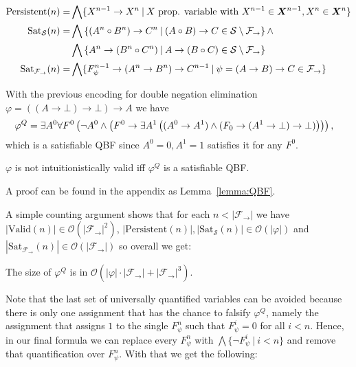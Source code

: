 \documentclass[runningheads]{llncs}
\begin{document}
\begin{definition}
\begin{align*}
		\text{\normalfont Persistent}(n) = & \bigwedge\{X^{n-1}\to X^n\:|\: X \text{ prop. variable with }X^{n-1}\in\vec X^{n-1}, X^n \in\vec X^{n}\}\\
		\text{\normalfont Sat}_{\mathcal S}(n) = &\bigwedge\left\{(A^n\circ B^n)\to C^n\:|\:(A\circ B)\to C\in \mathcal S\setminus\mathcal F_\to\right\}\wedge\\
		&\bigwedge\left\{A^n\to (B^n\circ C^n)\:|\:A\to (B\circ C)\in \mathcal S\setminus\mathcal F_\to\right\}\\
		\text{\normalfont Sat}_{\mathcal F_\to}(n) = & \bigwedge\{F^{n-1}_\psi\to (A^n\to B^n)\to C^{n-1}\:|\:\psi = (A\to B)\to C\in\mathcal F_\to\}
	\end{align*}
\end{definition}

\begin{example}
	With the previous encoding for double negation elimination $\varphi = ((A\to \bot)\to \bot)\to A$ we have
	$$\hspace*{-.3cm}
	\varphi^Q = \exists A^0\forall F^0\left(\neg A^0\wedge\left(F^0\to \exists A^1\left((A^0\to A^1)\wedge(F_0\to (A^1\to \bot)\to \bot)\right)\right)\right),
	$$
	which is a satisfiable QBF since $A^0 = 0, A^1 = 1$ satisfies it for any $F^0$.
\end{example}


\begin{lemma}
	$\varphi$ is not intuitionistically valid iff $\varphi^Q$ is a satisfiable QBF.
\end{lemma}
A proof can be found in the appendix as Lemma~\ref{lemma:QBF}.

A simple counting argument shows that for each $n < |\mathcal F_\to|$ we have $|\text{Valid}(n)|\in \mathcal O(|\mathcal F_\to|^2)$, $|\text{Persistent}(n)|, |\text{Sat}_{\mathcal S}(n)|\in \mathcal O(|\varphi|)$ and $|\text{Sat}_{\mathcal F_\to}(n)|\in \mathcal O(|\mathcal F_\to|)$ so overall we get:
\begin{lemma}
	The size of $\varphi^Q$ is in $\mathcal O(|\varphi|\cdot|\mathcal F_\to| + |\mathcal F_\to|^3)$.
\end{lemma}

Note that the last set of universally quantified variables can be avoided because there is only one assignment that has the chance to falsify $\varphi^Q$, namely the assignment that assigns $1$ to the single $F_\psi^n$ such that $F_\psi^i = 0$ for all $i < n$. Hence, in our final formula we can replace every $F_\psi^n$ with $\bigwedge\{\neg F_\psi^i\:|\:i < n\}$ and remove that quantification over $F_\psi^n$. With that we get the following:
\end{document}
